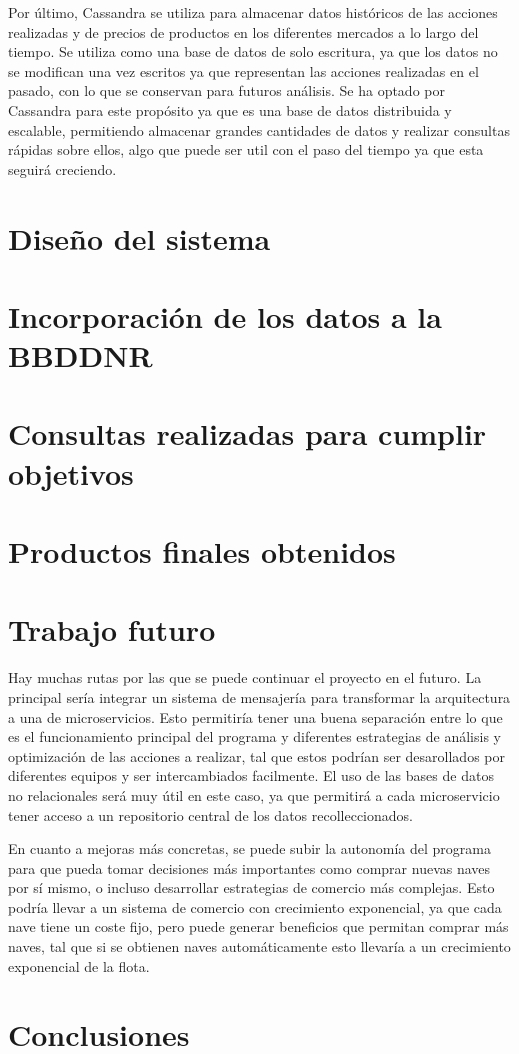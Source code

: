 \documentclass[spanish]{article}
\begin{document}
Por último, Cassandra se utiliza para almacenar datos históricos de las acciones realizadas y
de precios de productos en los diferentes mercados a lo largo del tiempo.
Se utiliza como una base de datos de solo escritura, ya que los datos no se modifican una vez escritos
ya que representan las acciones realizadas en el pasado, con lo que se conservan para futuros análisis.
Se ha optado por Cassandra para este propósito ya que es una base de datos distribuida y escalable,
permitiendo almacenar grandes cantidades de datos y realizar consultas rápidas sobre ellos,
algo que puede ser util con el paso del tiempo ya que esta seguirá creciendo.

\section{Diseño del sistema}

\section{Incorporación de los datos a la BBDDNR}

\section{Consultas realizadas para cumplir objetivos}

\section{Productos finales obtenidos}

\section{Trabajo futuro}

Hay muchas rutas por las que se puede continuar el proyecto en el futuro.
La principal sería integrar un sistema de mensajería para
transformar la arquitectura a una de microservicios.
Esto permitiría tener una buena separación entre lo que es
el funcionamiento principal del programa y diferentes estrategias
de análisis y optimización de las acciones a realizar, tal que estos podrían
ser desarollados por diferentes equipos y ser intercambiados facilmente.
El uso de las bases de datos no relacionales será muy útil en este caso,
ya que permitirá a cada microservicio tener acceso a un repositorio central
de los datos recolleccionados.

En cuanto a mejoras más concretas,
se puede subir la autonomía del programa para que pueda tomar decisiones
más importantes como comprar nuevas naves por sí mismo, o incluso
desarrollar estrategias de comercio más complejas.
Esto podría llevar a un sistema de comercio con crecimiento
exponencial, ya que cada nave tiene un coste fijo, pero
puede generar beneficios que permitan comprar más naves,
tal que si se obtienen naves automáticamente esto llevaría
a un crecimiento exponencial de la flota.

\section{Conclusiones}
\end{document}
